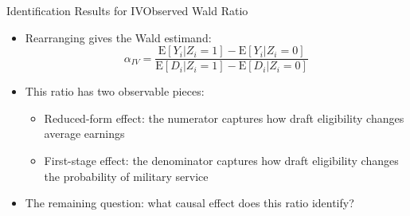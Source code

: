 \documentclass[dvipsnames,hyperref={pdfpagelabels=false}]{beamer}
\begin{document}
\begin{frame}{Identification Results for IV}{Observed Wald Ratio}
	\begin{itemize}
		
		\item Rearranging gives the Wald estimand:
		\begin{equation*}
			\alpha_{IV}=\dfrac{\mathrm{E}[Y_{i}|Z_{i}=1]-\mathrm{E}[Y_{i}|Z_{i}=0]}{\mathrm{E}[D_{i}|Z_{i}=1]-\mathrm{E}[D_{i}|Z_{i}=0]}
		\end{equation*} 
		
		\item This ratio has two observable pieces:
				\vspace{0.2cm}
		\begin{itemize}
			\item Reduced-form effect: the numerator captures how draft eligibility changes average earnings
					\vspace{0.2cm}
			\item First-stage effect: the denominator captures how draft eligibility changes the probability of military service
					\vspace{0.2cm}
		\end{itemize}
		
		\item The remaining question: what causal effect does this ratio identify?
		
	\end{itemize}
\end{frame}
\end{document}
